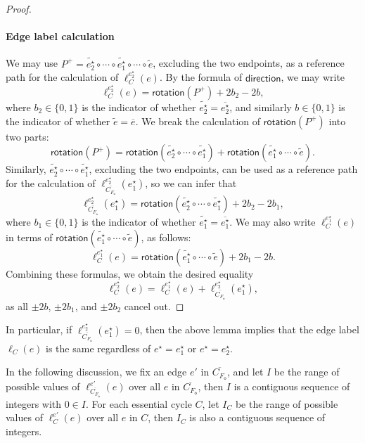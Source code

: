 \documentclass{article}\usepackage[a4paper,margin=20mm]{geometry}
\newcommand{\FO}{F_\mathsf{o}}
\newcommand{\rotation}{\mathsf{rotation}}
\newcommand{\direction}{\mathsf{direction}}
\newcommand{\eref}{e^\star}
\begin{document}
\begin{proof}
\paragraph{Edge label calculation}
We may use $P^+=\tilde{\eref_2} \circ \cdots \circ \tilde{\eref_1} \circ \cdots \circ \tilde{e}$, excluding the two endpoints, as a reference path for the calculation of $\ell_C^{\eref_2}(e)$.
By the formula of $\direction$, we may write 
\[\ell_C^{\eref_2}(e) = \rotation(P^+) +2b_2 - 2b,\]
where $b_2 \in \{0,1\}$ is the indicator of whether $\tilde{\eref_2} = \overline{\eref_2}$, and similarly $b \in \{0,1\}$ is the indicator of whether $\tilde{e} = \overline{e}$. We  break the calculation of $\rotation(P^+)$ into two parts:
\[\rotation(P^+) = \rotation(\tilde{\eref_2} \circ \cdots \circ \tilde{\eref_1}) + \rotation(\tilde{\eref_1} \circ \cdots \circ \tilde{e}).\]
Similarly, $\tilde{\eref_2} \circ \cdots \circ \tilde{\eref_1}$, excluding the two endpoints, can be used as a reference path for the calculation of $\ell_{\overline{C_{\FO}}}^{\eref_2}(\eref_1)$, so we can infer that
\[\ell_{\overline{C_{\FO}}}^{\eref_2}(\eref_1) = \rotation(\tilde{\eref_2} \circ \cdots \circ \tilde{\eref_1}) +2b_2 - 2b_1,\]
where $b_1 \in \{0,1\}$ is the indicator of whether $\tilde{\eref_1} = \overline{\eref_1}$. We may also write $\ell_C^{\eref_1}(e)$ in terms of $\rotation(\tilde{\eref_1} \circ \cdots \circ \tilde{e})$, as follows:
\[\ell_C^{\eref_1}(e) = \rotation(\tilde{\eref_1} \circ \cdots \circ \tilde{e}) +2b_1 - 2b.\]
Combining these formulas, we obtain the desired equality \[\ell_C^{\eref_2}(e)=\ell_C^{\eref_1}(e) + \ell_{\overline{C_{\FO}}}^{\eref_2}(\eref_1),\] 
as all $\pm2b$, $\pm2b_1$, and $\pm2b_2$ cancel out. 
\end{proof}

 In particular, if $\ell_{\overline{C_{\FO}}}^{\eref_2}(\eref_1) = 0$, then the above lemma implies that the edge label $\ell_C(e)$ is the same regardless of $\eref = \eref_1$ or $\eref = \eref_2$. 

In the following discussion, we fix an edge $e'$ in $\overline{C_{\FO}}$, and let $I$ be the range of possible values of $\ell_{\overline{C_{\FO}}}^{e'}(e)$ over all $e$ in $\overline{C_{\FO}}$, then $I$ is a contiguous sequence of integers with $0 \in I$. For each essential cycle $C$, let $I_C$ be the range of possible values of $\ell_C^{e'}(e)$  over all $e$ in $C$, then $I_C$ is also a contiguous sequence of integers. 
\end{document}
